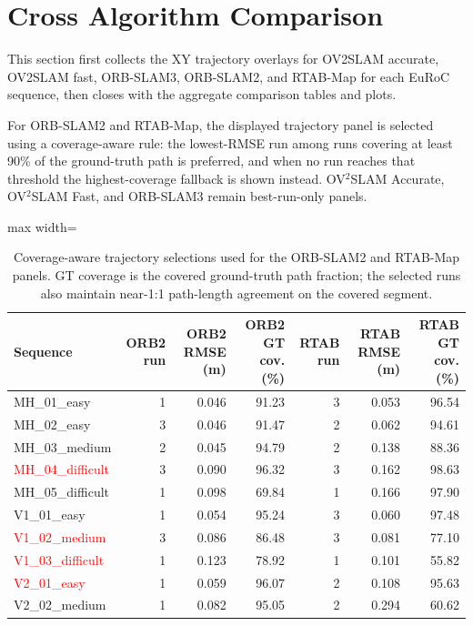 \documentclass[11pt]{article}
\begin{document}
\clearpage

\section{Cross Algorithm Comparison}

This section first collects the XY trajectory overlays for OV2SLAM accurate, OV2SLAM fast, ORB-SLAM3, ORB-SLAM2, and RTAB-Map for each EuRoC sequence, then closes with the aggregate comparison tables and plots.

For ORB-SLAM2 and RTAB-Map, the displayed trajectory panel is selected using a coverage-aware rule: the lowest-RMSE run among runs covering at least 90\% of the ground-truth path is preferred, and when no run reaches that threshold the highest-coverage fallback is shown instead. OV$^{2}$SLAM Accurate, OV$^{2}$SLAM Fast, and ORB-SLAM3 remain best-run-only panels.

\begin{table}[H]
\centering
\scriptsize
\caption{Coverage-aware trajectory selections used for the ORB-SLAM2 and RTAB-Map panels. GT coverage is the covered ground-truth path fraction; the selected runs also maintain near-1:1 path-length agreement on the covered segment.}
\label{tab:trajectory_selection_summary}
\begin{adjustbox}{max width=\textwidth}
\begin{tabular}{lrrr|rrr}
\toprule
Sequence & ORB2 run & ORB2 RMSE (m) & ORB2 GT cov. (\%) & RTAB run & RTAB RMSE (m) & RTAB GT cov. (\%) \\
\midrule
MH\_01\_easy & 1 & 0.046 & 91.23 & 3 & 0.053 & 96.54 \\
MH\_02\_easy & 3 & 0.046 & 91.47 & 2 & 0.062 & 94.61 \\
MH\_03\_medium & 2 & 0.045 & 94.79 & 2 & 0.138 & 88.36 \\
\textcolor{red}{MH\_04\_difficult} & 3 & 0.090 & 96.32 & 3 & 0.162 & 98.63 \\
MH\_05\_difficult & 1 & 0.098 & 69.84 & 1 & 0.166 & 97.90 \\
V1\_01\_easy & 1 & 0.054 & 95.24 & 3 & 0.060 & 97.48 \\
\textcolor{red}{V1\_02\_medium} & 3 & 0.086 & 86.48 & 3 & 0.081 & 77.10 \\
\textcolor{red}{V1\_03\_difficult} & 1 & 0.123 & 78.92 & 1 & 0.101 & 55.82 \\
\textcolor{red}{V2\_01\_easy} & 1 & 0.059 & 96.07 & 2 & 0.108 & 95.63 \\
V2\_02\_medium & 1 & 0.082 & 95.05 & 2 & 0.294 & 60.62 \\
\bottomrule
\end{tabular}
\end{adjustbox}
\end{table}
\end{document}
